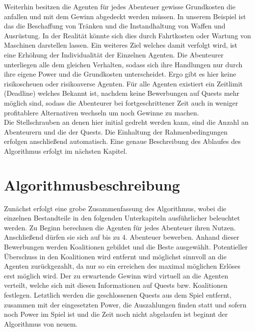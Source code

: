 \documentclass[fleqn,10pt]{SelfArx} %
\begin{document}
Weiterhin besitzen die Agenten für jedes Abenteuer gewisse Grundkosten die anfallen und mit dem Gewinn abgedeckt werden müssen. In unserem Beispiel ist das die Beschaffung von Tränken und die Instandhaltung von Waffen und Ausrüstung. In der Realität könnte sich dies durch Fahrtkosten oder Wartung von Maschinen darstellen lassen. Ein weiteres Ziel welches damit verfolgt wird, ist eine Erhöhung der Individualität der Einzelnen Agenten. Die Abenteurer unterliegen alle dem gleichen Verhalten, sodass sich ihre Handlungen nur durch ihre eigene Power und die Grundkosten unterscheidet. Ergo gibt es hier keine risikoscheuen oder risikoaverse Agenten. Für alle Agenten existiert ein Zeitlimit (Deadline) welches Bekannt ist, nachdem keine Bewerbungen auf Quests mehr möglich sind, sodass die Abenteurer bei fortgeschrittener Zeit auch in weniger profitablere Alternativen wechseln um noch Gewinne zu machen.\\
Die Stellschrauben an denen hier initial gedreht werden kann, sind die Anzahl an Abenteurern und die der Quests. Die Einhaltung der Rahmenbedingungen erfolgen anschließend automatisch. Eine genaue Beschreibung des Ablaufes des Algorithmus erfolgt im nächsten Kapitel.\\






\section{Algorithmusbeschreibung}
\label{sec:Algorithmus}
Zunächst erfolgt eine grobe Zusammenfassung des Algorithmus, wobei die einzelnen Bestandteile in den folgenden Unterkapiteln ausführlicher beleuchtet werden. Zu Beginn berechnen die Agenten für jedes Abenteuer ihren Nutzen. Anschließend dürfen sie sich auf bis zu 4. Abenteuer bewerben. Anhand dieser Bewerbungen werden Koalitionen gebildet und die Beste ausgewählt. Potentieller Überschuss in den Koalitionen wird entfernt und möglichst sinnvoll an die Agenten zurückgezahlt, da nur so ein erreichen des maximal möglichen Erlöses erst möglich wird. Der zu erwartende Gewinn wird virtuell an die Agenten verteilt, welche sich mit diesen Informationen auf Quests bzw. Koalitionen festlegen. Letztlich werden die geschlossenen Quests aus dem Spiel entfernt, zusammen mit der eingesetzten Power, die Auszahlungen finden statt und sofern noch Power im Spiel ist und die Zeit noch nicht abgelaufen ist beginnt der Algorithmus von neuem.
\end{document}
